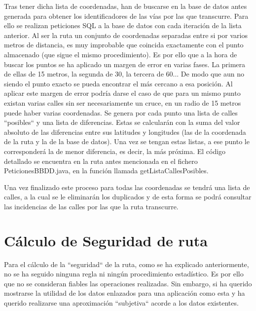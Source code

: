 Tras tener dicha lista de coordenadas, han de buscarse en la base de datos antes generada para obtener los identificadores de las vías por las que transcurre. Para ello se realizan peticiones SQL  a la base de datos con cada iteración de la lista anterior.
Al ser la ruta un conjunto de coordenadas separadas entre si por varios metros de distancia, es muy improbable que coincida exactamente con el punto almacenado (que sigue el mismo procedimiento). Es por ello que a la hora de buscar los puntos se ha aplicado un margen de error en varias fases. La primera de ellas de 15 metros, la segunda de 30, la tercera de 60... De modo que aun no siendo el punto exacto se pueda encontrar el más cercano a esa posición.
Al aplicar este margen de error podría darse el caso de que para un mismo punto existan varias calles sin ser necesariamente un cruce, en un radio de 15 metros puede haber varias coordenadas. Se genera por cada punto una lista de calles ``posibles`` y una lista de diferencias. Estas se calcularán con la suma del valor absoluto de las diferencias entre sus latitudes y longitudes (las de la coordenada de la ruta y la de la base de datos). Una vez se tengan estas listas, a ese punto le corresponderá la de menor diferencia, es decir, la más próxima.
El código detallado se encuentra en la ruta antes mencionada en el fichero PeticionesBBDD.java, en la función llamada getListaCallesPosibles.

Una vez finalizado este proceso para todas las coordenadas se tendrá una lista de calles, a la cual se le eliminarán los duplicados y de esta forma se podrá consultar las incidencias de las calles por las que la ruta transcurre.















\clearpage
\section{Cálculo de Seguridad de ruta}

Para el cálculo de la ``seguridad`` de la ruta, como se ha explicado anteriormente, no se ha seguido ninguna regla ni ningún procedimiento estadístico. Es por ello que no se consideran fiables las operaciones realizadas.
Sin embargo, si ha querido mostrarse la utilidad de los datos enlazados para una aplicación como esta y ha querido realizarse una aproximación ``subjetiva`` acorde a los datos existentes.

